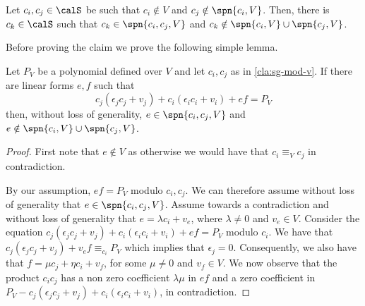 \begin{claim} \label{cla:sg-mod-v}
Let $c_i, c_j \in \calS$ be such that $c_i \notin V$ and $c_j \notin \spn{c_i,V}$. Then, there is $c_k \in \calS$ such that $c_k \in \spn{c_i,c_j,V}$ and $c_k \notin \spn{c_i,V}\cup \spn{c_j,V}$.
\end{claim}

Before proving the claim we prove the following simple lemma.

\begin{lemma}\label{lem:ef}
Let $P_V$ be a polynomial defined over $V$ and let $c_i,c_j$ as in \autoref{cla:sg-mod-v}. If there are linear forms $e,f$ such that $$c_j(\epsilon_j c_j + v_j) + c_i(\epsilon_i c_i + v_i) + ef = P_V$$ then, without loss of generality,  $e \in \spn{c_i,c_j,V}$ and $e \notin \spn{c_i,V}\cup \spn{c_j,V}$.
\end{lemma}

\begin{proof}



First note that $e\not\in V$ as otherwise we would have that $c_i\equiv_V c_j$ in contradiction.

By our assumption, $ef =P_V$ modulo $c_i,c_j$.  We can therefore assume without loss of generality that  $e \in \spn{c_i,c_j,V}$. 
Assume towards a contradiction and without loss of generality that  $e = \lambda c_i + v_e$, where $\lambda \neq 0$ and $v_e\in V$. Consider the equation $c_j(\epsilon_j c_j + v_j) + c_i(\epsilon_i c_i + v_i) + ef = P_V$ modulo $c_i$. We have that $c_j(\epsilon_j c_j + v_j) + v_e f \equiv_{c_i} P_V$ which implies that $\epsilon_j=0$. Consequently, we also have that  $f = \mu c_j + \eta c_i + v_f$, for some $\mu \neq 0$ and $v_f \in V$. We now observe that the product $c_ic_j$ has a non zero coefficient $\lambda\mu$ in $ef$ and a zero coefficient in $P_V - c_j(\epsilon_j c_j + v_j) + c_i(\epsilon_i c_i + v_i) $, in contradiction.
\end{proof}

